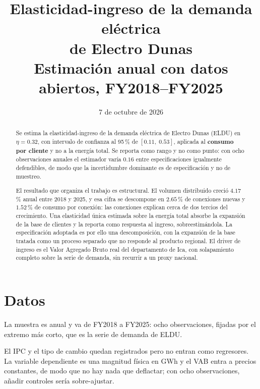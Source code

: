 \documentclass[11pt,a4paper]{article}
\title{\textbf{Elasticidad-ingreso de la demanda eléctrica\\ de Electro Dunas}\\[0.45em]
       \large Estimación anual con datos abiertos, FY2018--FY2025}
\author{}
\date{7 de octubre de 2026}
\begin{document}
\maketitle
\thispagestyle{empty}

\begin{abstract}
\noindent
Se estima la elasticidad-ingreso de la demanda eléctrica de Electro Dunas
(ELDU) en $\eta = 0{.}32$, con intervalo de confianza al 95\,\% de
$[0{.}11,\;0{.}53]$, aplicada al \textbf{consumo por cliente} y no a la energía
total. Se reporta como rango y no como punto: con ocho observaciones anuales el
estimador varía $0{.}16$ entre especificaciones igualmente defendibles, de modo
que la incertidumbre dominante es de especificación y no de muestreo.

El resultado que organiza el trabajo es estructural. El volumen distribuido
creció $4{.}17$\,\% anual entre 2018 y 2025, y esa cifra se descompone en
$2{.}65$\,\% de conexiones nuevas y $1{.}52$\,\% de consumo por conexión: las
conexiones explican cerca de dos tercios del crecimiento. Una elasticidad única
estimada sobre la energía total absorbe la expansión de la base de clientes y la
reporta como respuesta al ingreso, sobreestimándola. La especificación adoptada
es por ello una descomposición, con la expansión de la base tratada como un
proceso separado que no responde al producto regional. El driver de ingreso es
el Valor Agregado Bruto real del departamento de Ica, con solapamiento completo
sobre la serie de demanda, sin recurrir a un proxy nacional.
\end{abstract}

\vspace{0.6em}

\section{Datos}

La muestra es anual y va de FY2018 a FY2025: ocho observaciones, fijadas por el
extremo más corto, que es la serie de demanda de ELDU.

\begin{table}[H]
\centering
\caption{Series utilizadas.}
\small

\end{table}

El IPC y el tipo de cambio quedan registrados pero no entran como regresores. La
variable dependiente es una magnitud física en GWh y el VAB entra a precios
constantes, de modo que no hay nada que deflactar; con ocho observaciones,
añadir controles sería sobre-ajustar.
\end{document}
